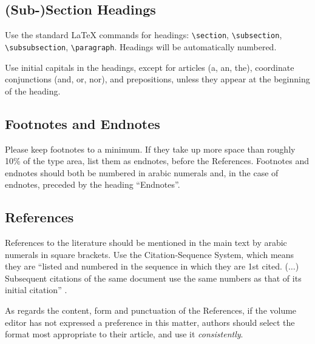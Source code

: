 \documentclass{IOS-Book-Article}
\begin{document}
\subsection{(Sub-)Section Headings}
Use the standard \LaTeX{} commands for headings: {\small \verb|\section|, \verb|\subsection|, \verb|\subsubsection|, \verb|\paragraph|}.
Headings will be automatically numbered.

Use initial capitals in the headings, except for articles (a, an, the), coordinate
conjunctions (and, or, nor), and prepositions, unless they appear at the beginning
of the heading.

\subsection{Footnotes and Endnotes}
Please keep footnotes to a minimum. If they take up more space than roughly 10\% of
the type area, list them as endnotes, before the References. Footnotes and endnotes
should both be numbered in arabic numerals and, in the case of endnotes, preceded by
the heading ``Endnotes''.

\subsection{References}

References to the literature should be mentioned in the main text by arabic numerals in
square brackets. Use the Citation-Sequence System, which means they are ``listed and
numbered in the sequence in which they are 1st cited. ($\ldots$) Subsequent citations of the
same document use the same numbers as that of its initial citation'' \cite{r1}.

As regards the content, form and punctuation of the References, if the volume
editor has not expressed a preference in this matter, authors should select the format
most appropriate to their article, and use it \textit{consistently}.
\end{document}
